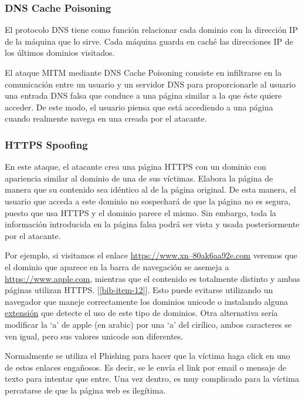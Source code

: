 \documentclass[11pt]{article}
\begin{document}
\subsubsection*{DNS Cache Poisoning}

 El protocolo DNS tiene como función relacionar cada dominio con la dirección IP de la máquina que lo sirve. Cada máquina guarda en caché las direcciones IP de los últimos dominios visitados.
 
 El ataque MITM mediante DNS Cache Poisoning consiste en infiltrarse en la comunicación entre un usuario y un servidor DNS para proporcionarle al usuario una entrada DNS falsa que conduce a una página similar a la que éste quiere acceder. De este modo, el usuario piensa que está accediendo a una página cuando realmente navega en una creada por el atacante.
 
 \subsubsection*{HTTPS Spoofing}
 
 En este ataque, el atacante crea una página HTTPS con un dominio con apariencia similar al dominio de una de sus víctimas. Elabora la página de manera que su contenido sea idéntico al de la página original. De esta manera, el usuario que acceda a este dominio no sospechará de que la página no es segura, puesto que usa HTTPS y el dominio parece el mismo. Sin embargo, toda la información introducida en la página falsa podrá ser vista y usada posteriormente por el atacante.
 
 Por ejemplo, si visitamos el enlace \href{https://www.xn--80ak6aa92e.com}{https://www.xn--80ak6aa92e.com} veremos que el dominio que aparece en la
  barra de navegación se asemeja a \href{https://www.apple.com}{https://www.apple.com}, mientras que el contenido es totalmente distinto y ambas páginas
   utilizan HTTPS. [\ref{bib-item-12}]. Esto puede evitarse utilizando un navegador que maneje correctamente los dominios unicode o instalando alguna
  \href{https://github.com/yabirgb/punycodeAlert}{extensión} que detecte
 el uso de este tipo de dominios. Otra alternativa sería modificar la `a' de apple (en arabic) por una `a' del cirílico, ambos caracteres se ven
 igual, pero sus valores unicode son diferentes.
 
 Normalmente se utiliza el Phishing para hacer que la víctima haga click en uno de estos enlaces engañosos. Es decir, se le envía el link por email o mensaje de texto para intentar que entre. Una vez dentro, es muy complicado para la víctima percatarse de que la página web es ilegítima.
 
\end{document}
